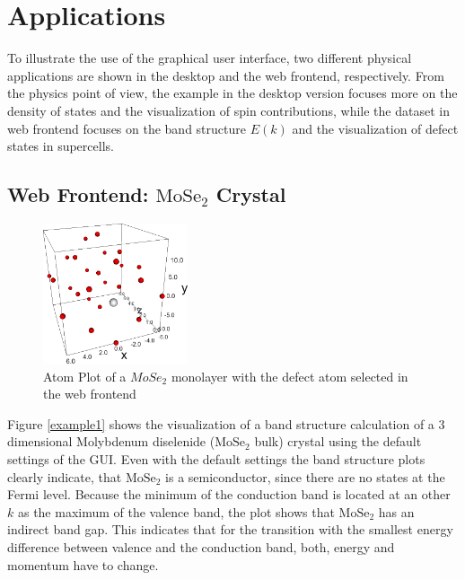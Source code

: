 \chapter{Applications}
\label{chap:applications}


To illustrate the use of the graphical user interface, two different physical
applications are shown in the desktop and the web frontend, respectively. From
the physics point of view, the example in the desktop version focuses more on the
density of states and the visualization of spin contributions, while the dataset
in web frontend focuses on the band structure $E(k)$ and the visualization
of defect states in supercells.

\section{Web Frontend: $\textrm{MoSe}_2$ Crystal}

\begin{figure} %
    \centering
    \includegraphics[width=0.38\textwidth]{christian/screen4_atomplot_defect.png}
    \caption[Atom Plot of a $\textrm{MoSe}_2$ monolayer]{Atom Plot of a $MoSe_2$ monolayer with the defect atom selected in
      the web frontend}
    \label{fig:modules}
\end{figure}

Figure \ref{example1} shows the visualization of a band structure calculation of a 3 dimensional Molybdenum diselenide ($\textrm{MoSe}_2$ bulk) crystal using the default settings of the GUI. Even with the default settings the band structure plots clearly indicate, that $\textrm{MoSe}_2$ is a semiconductor, since there are no states at the Fermi level. Because the minimum of the conduction band is located at an other $k$ as the maximum of the valence band, the plot shows that $\textrm{MoSe}_2$ has an indirect band gap. This indicates that for the transition with the smallest energy difference between valence and the conduction band, both, energy and momentum have to change.

